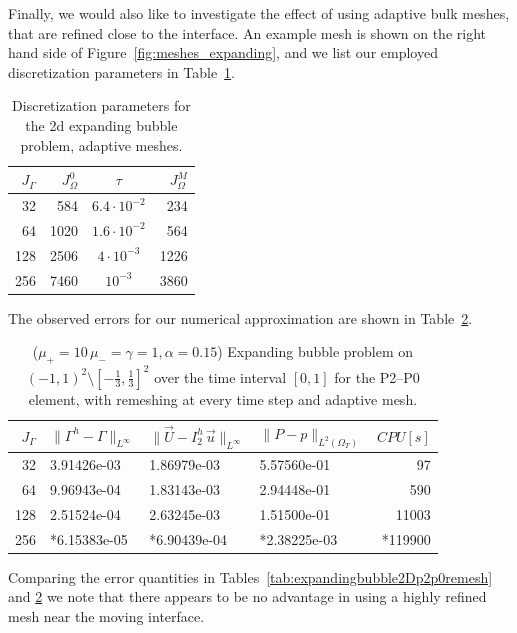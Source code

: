 \documentclass[a4paper,12pt,onecolumn]{article}
\newcommand{\errorXx}{\|\Gamma^h - \Gamma\|_{L^\infty}}
\newcommand{\errorUu}[1]{\|\vec U - I^h_{#1}\,\vec u\|_{L^\infty}}
\newcommand{\LerrorPp}{\|P - p\|_{L^2(\Omega_T)}}
\begin{document}
Finally, we would also like to investigate the effect of using adaptive bulk
meshes, that are refined close to the interface. An example mesh is shown on
the right hand side of Figure~\ref{fig:meshes_expanding}, and we list our
employed discretization parameters in
Table~\ref{tab:expandingbubble2Delements_adaptive}.
\begin{table}
\center
\begin{tabular}{rrcr}
\hline
$J_\Gamma$ & $J_\Omega^0$ & $\tau$ & $J_\Omega^M$ \\
\hline
 32 &  584 & $6.4\cdot10^{-2}$ &  234 \\
 64 & 1020 & $1.6\cdot10^{-2}$ &  564 \\
128 & 2506 &   $4\cdot10^{-3}$ & 1226 \\
256 & 7460 &         $10^{-3}$ & 3860 \\
\hline
\end{tabular}
\caption{Discretization parameters for the 2d expanding bubble problem,
adaptive meshes.}
\label{tab:expandingbubble2Delements_adaptive}
\end{table}
The observed errors for our numerical approximation are shown in
Table~\ref{tab:expandingbubble2Dp2p0adaptive}.
\begin{table}
 \center
\begin{tabular}{rlllr}
\hline
$J_\Gamma$ & $\errorXx$ & $\errorUu2$ & $\LerrorPp$ & $CPU[s]$\\
\hline
 32 & 3.91426e-03 & 1.86979e-03 & 5.57560e-01 &   97 \\
 64 & 9.96943e-04 & 1.83143e-03 & 2.94448e-01 &   590 \\
128 & 2.51524e-04 & 2.63245e-03 & 1.51500e-01 & 11003 \\
256 & *6.15383e-05 & *6.90439e-04 & *2.38225e-03 & *119900\\
\hline
\end{tabular}
\caption{($\mu_+ = 10\,\mu_- = \gamma = 1,\alpha = 0.15$) Expanding bubble
problem on $(-1,1)^2\setminus[-\frac{1}{3},\frac{1}{3}]^2$ over the time
interval $[0,1]$ for the P2--P0 element, with remeshing at every time step and
adaptive mesh.}
\label{tab:expandingbubble2Dp2p0adaptive}
\end{table}
Comparing the error quantities in Tables~\ref{tab:expandingbubble2Dp2p0remesh}
and \ref{tab:expandingbubble2Dp2p0adaptive} we note that there appears to be no
advantage in using a highly refined mesh near the moving interface.
\end{document}
